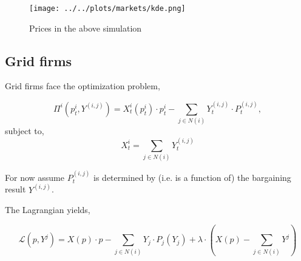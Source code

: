 \documentclass[american]{scrartcl}
\newcommand{\E}{\mathbb{E}}
\begin{document}
\begin{figure}
    \centering
    \texttt{[image: ../../plots/markets/kde.png]}
    \label{fig:price}
    \caption{Prices in the above simulation}
\end{figure}

\subsection{Grid firms}

Grid firms face the optimization problem,

\begin{equation}
    \Pi^i\left(p^i_t, Y^{(i, j)}\right) = X^i_{t}(p^i_t) \cdot p^i_t - \sum_{j \in N(i)} Y^{(i, j)}_{t} \cdot P^{(i, j)}_t,
\end{equation}
subject to,
\begin{equation}
    X^i_t=  \sum_{j \in N(i)} Y^{(i, j)}_{t}
\end{equation}

For now assume $P_t^{(i, j)}$ is determined by (i.e. is a function of) the bargaining result $Y^{(i, j)}$.

The Lagrangian yields,

\begin{equation}
    \mathcal{L}\left(p, Y^j\right) = X(p) \cdot p - \sum_{j \in N(i)} Y_j \cdot P_j (Y_j) + \lambda\cdot \left(X(p) - \sum_{j \in N(i)} Y^j\right)
\end{equation}
\end{document}
